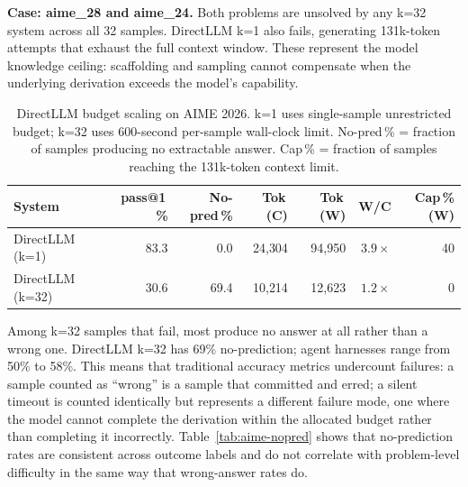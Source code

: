 \textbf{Case: aime\_28 and aime\_24.}
Both problems are unsolved by any k=32 system across all 32 samples.
DirectLLM k=1 also fails, generating 131k-token attempts that exhaust the
full context window.
These represent the model knowledge ceiling: scaffolding and sampling cannot
compensate when the underlying derivation exceeds the model's capability.

\begin{table}[t]
\centering
\small
\caption{%
  DirectLLM budget scaling on AIME 2026.
  k=1 uses single-sample unrestricted budget; k=32 uses 600-second per-sample
  wall-clock limit.
  No-pred\,\% = fraction of samples producing no extractable answer.
  Cap\,\% = fraction of samples reaching the 131k-token context limit.
}
\label{tab:aime-budget}
\setlength{\tabcolsep}{4pt}
\begin{tabular}{lrrrrrr}
\toprule
System & pass@1\,\% & No-pred\,\% & Tok\,(C) & Tok\,(W) & W/C & Cap\,\%(W) \\
\midrule
DirectLLM (k=1)  & 83.3 &  0.0 & 24{,}304 & 94{,}950 & $3.9{\times}$ & 40 \\
DirectLLM (k=32) & 30.6 & 69.4 & 10{,}214 & 12{,}623 & $1.2{\times}$ &  0 \\
\bottomrule
\end{tabular}
\end{table}


Among k=32 samples that fail, most produce no answer at all rather than a
wrong one.
DirectLLM k=32 has 69\% no-prediction; agent harnesses range from 50\% to
58\%.
This means that traditional accuracy metrics undercount failures: a sample
counted as ``wrong'' is a sample that committed and erred; a silent timeout
is counted identically but represents a different failure mode, one where the
model cannot complete the derivation within the allocated budget rather than
completing it incorrectly.
Table~\ref{tab:aime-nopred} shows that no-prediction rates are consistent
across outcome labels and do not correlate with problem-level difficulty
in the same way that wrong-answer rates do.

